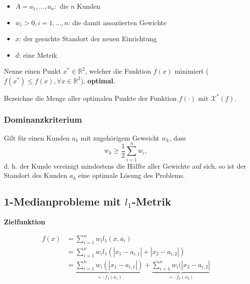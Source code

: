       \begin{itemize}
        \item $A = {a_1, \dots, a_n}:$ die $n$ Kunden
        \item $w_i > 0, i = 1, \dots, n$: die damit assoziierten Gewichte
        \item $x$: der gesuchte Standort der neuen Einrichtung 
        \item $d$: eine Metrik
      \end{itemize}

      \par Nenne einen Punkt $x^* \in \mathbb{R}^2$, welcher die Funktion $f(x)$ minimiert ($f(x^*) \leq f(x), \forall x \in \mathbb{R}^2$), \textbf{optimal}.

      \par Bezeichne die Menge aller optimalen Punkte der Funktion $f(\cdot)$ mit $\mathcal{X}^*(f)$.


      \subsubsection{Dominanzkriterium} %
      \label{ssub:dominanzkriterium}

        \par Gilt für einen Kunden $a_k$ mit zugehörigem Geweicht $w_k$, dass 
        \[w_k \geq \frac{1}{2}\sum_{i=1}^{n}w_i ,\]
        d. h. der Kunde vereinigt mindestens die Hälfte aller Gewichte auf sich, so ist der Standort des Kunden $a_k$ eine optimale Lösung des Problems.
      


    \subsection{1-Medianprobleme mit $l_1$-Metrik} %
    \label{sub:1_medianprobleme_mit_l1_Metrik}
    
      \par {\color{blue}{Aufgabe 7}}

      \par \textbf{Zielfunktion}

      \begin{equation}
        \begin{aligned}
            f(x) &= \sum_{i=1}^{n}w_il_1(x, a_i) \\
                 &= \sum_{i=1}^{n}w_il_1(\left|x_1 - a_{i,1}\right| + \left|x_2 - a_{i,2}\right|) \\
                 &= \underbrace{\sum_{i=1}^{n}w_i(\left|x_1 - a_{i,1}\right|)}_{=: f_1(x_1)} + \underbrace{\sum_{i=1}^{n}w_i(\left|x_2 - a_{i,2}\right|}_{=:f_2(x_2)}
        \end{aligned}
      \end{equation}

